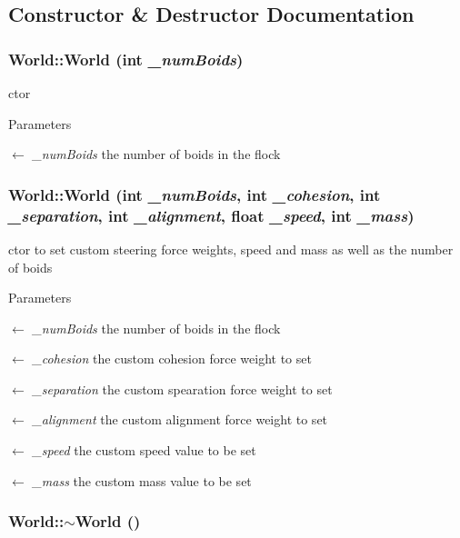 \subsection{Constructor \& Destructor Documentation}
\hypertarget{classWorld_a32b0ef05df703ff5fa85fe1a1f76d448}{
\subsubsection[{World}]{\setlength{\rightskip}{0pt plus 5cm}World::World (int {\em \_\-numBoids})}}
\label{classWorld_a32b0ef05df703ff5fa85fe1a1f76d448}


ctor 
\begin{DoxyParams}{Parameters}
\item[\mbox{$\leftarrow$} {\em \_\-numBoids}]the number of boids in the flock \end{DoxyParams}
\hypertarget{classWorld_a514d5dbba0e367784e1c36dd153f1e73}{
\subsubsection[{World}]{\setlength{\rightskip}{0pt plus 5cm}World::World (int {\em \_\-numBoids}, \/  int {\em \_\-cohesion}, \/  int {\em \_\-separation}, \/  int {\em \_\-alignment}, \/  float {\em \_\-speed}, \/  int {\em \_\-mass})}}
\label{classWorld_a514d5dbba0e367784e1c36dd153f1e73}


ctor to set custom steering force weights, speed and mass as well as the number of boids 
\begin{DoxyParams}{Parameters}
\item[\mbox{$\leftarrow$} {\em \_\-numBoids}]the number of boids in the flock \item[\mbox{$\leftarrow$} {\em \_\-cohesion}]the custom cohesion force weight to set \item[\mbox{$\leftarrow$} {\em \_\-separation}]the custom spearation force weight to set \item[\mbox{$\leftarrow$} {\em \_\-alignment}]the custom alignment force weight to set \item[\mbox{$\leftarrow$} {\em \_\-speed}]the custom speed value to be set \item[\mbox{$\leftarrow$} {\em \_\-mass}]the custom mass value to be set \end{DoxyParams}
\hypertarget{classWorld_a8c73fba541a5817fff65147ba47cd827}{
\subsubsection[{$\sim$World}]{\setlength{\rightskip}{0pt plus 5cm}World::$\sim$World ()}}
\label{classWorld_a8c73fba541a5817fff65147ba47cd827}


